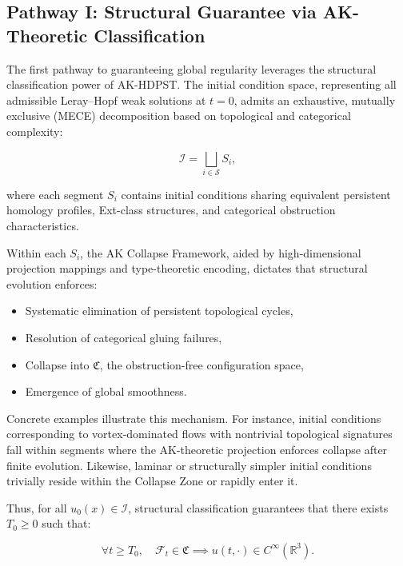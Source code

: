 \documentclass[11pt]{article}
\begin{document}
\subsection{Pathway I: Structural Guarantee via AK-Theoretic Classification}

The first pathway to guaranteeing global regularity leverages the structural classification power of AK-HDPST. The initial condition space, representing all admissible Leray--Hopf weak solutions at $t = 0$, admits an exhaustive, mutually exclusive (MECE) decomposition based on topological and categorical complexity:

\begin{equation}
\mathcal{I} = \bigsqcup_{i \in \mathcal{S}} S_i,
\end{equation}

where each segment $S_i$ contains initial conditions sharing equivalent persistent homology profiles, Ext-class structures, and categorical obstruction characteristics.

Within each $S_i$, the AK Collapse Framework, aided by high-dimensional projection mappings and type-theoretic encoding, dictates that structural evolution enforces:

\begin{itemize}
  \item Systematic elimination of persistent topological cycles,
  \item Resolution of categorical gluing failures,
  \item Collapse into $\mathfrak{C}$, the obstruction-free configuration space,
  \item Emergence of global smoothness.
\end{itemize}

Concrete examples illustrate this mechanism. For instance, initial conditions corresponding to vortex-dominated flows with nontrivial topological signatures fall within segments where the AK-theoretic projection enforces collapse after finite evolution. Likewise, laminar or structurally simpler initial conditions trivially reside within the Collapse Zone or rapidly enter it.

Thus, for all $u_0(x) \in \mathcal{I}$, structural classification guarantees that there exists $T_0 \geq 0$ such that:

\begin{equation}
\forall t \geq T_0,\quad \mathcal{F}_t \in \mathfrak{C} \implies u(t, \cdot) \in C^\infty(\mathbb{R}^3).
\end{equation}
\end{document}
